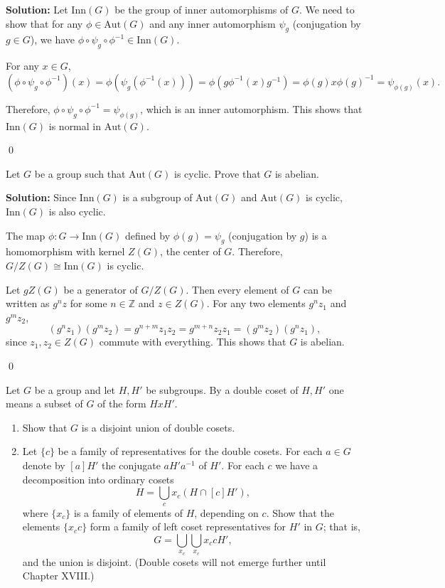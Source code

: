 \noindent\textbf{Solution:} Let $\text{Inn}(G)$ be the group of inner automorphisms of $G$. We need to show that for any $\phi \in \text{Aut}(G)$ and any inner automorphism $\psi_g$ (conjugation by $g \in G$), we have $\phi \circ \psi_g \circ \phi^{-1} \in \text{Inn}(G)$.

For any $x \in G$,
\[(\phi \circ \psi_g \circ \phi^{-1})(x) = \phi(\psi_g(\phi^{-1}(x))) = \phi(g\phi^{-1}(x)g^{-1}) = \phi(g)x\phi(g)^{-1} = \psi_{\phi(g)}(x).\]

Therefore, $\phi \circ \psi_g \circ \phi^{-1} = \psi_{\phi(g)}$, which is an inner automorphism. This shows that $\text{Inn}(G)$ is normal in $\text{Aut}(G)$.


\qed
\begin{problembox}
Let $G$ be a group such that $\text{Aut}(G)$ is cyclic. Prove that $G$ is abelian.
\end{problembox}

\noindent\textbf{Solution:} Since $\text{Inn}(G)$ is a subgroup of $\text{Aut}(G)$ and $\text{Aut}(G)$ is cyclic, $\text{Inn}(G)$ is also cyclic.

The map $\phi: G \to \text{Inn}(G)$ defined by $\phi(g) = \psi_g$ (conjugation by $g$) is a homomorphism with kernel $Z(G)$, the center of $G$. Therefore, $G/Z(G) \cong \text{Inn}(G)$ is cyclic.

Let $gZ(G)$ be a generator of $G/Z(G)$. Then every element of $G$ can be written as $g^nz$ for some $n \in \mathbb{Z}$ and $z \in Z(G)$. For any two elements $g^nz_1$ and $g^mz_2$,
\[(g^nz_1)(g^mz_2) = g^{n+m}z_1z_2 = g^{m+n}z_2z_1 = (g^mz_2)(g^nz_1),\]
since $z_1, z_2 \in Z(G)$ commute with everything. This shows that $G$ is abelian.


\qed
\begin{problembox}
Let $G$ be a group and let $H, H'$ be subgroups. By a double coset of $H, H'$ one means a subset of $G$ of the form $HxH'$.
\begin{enumerate}[label=(\alph*)]
\item Show that $G$ is a disjoint union of double cosets.
\item Let $\{c\}$ be a family of representatives for the double cosets. For each $a \in G$ denote by $[a]H'$ the conjugate $aH'a^{-1}$ of $H'$. For each $c$ we have a decomposition into ordinary cosets
\[H = \bigcup_{c}x_c(H \cap [c]H'),\]
where $\{x_c\}$ is a family of elements of $H$, depending on $c$. Show that the elements $\{x_c c\}$ form a family of left coset representatives for $H'$ in $G$; that is,
\[G = \bigcup_{x_c}\bigcup_{x_c}x_c cH',\]
and the union is disjoint. (Double cosets will not emerge further until Chapter XVIII.)
\end{enumerate}
\end{problembox}

